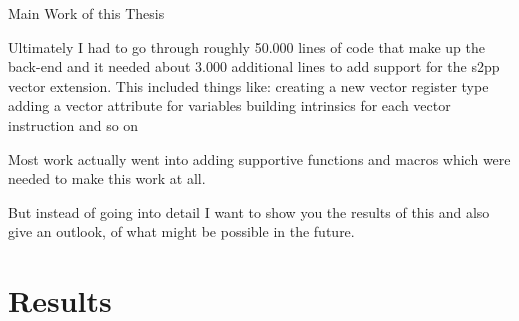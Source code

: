 \documentclass[10pt,aspectratio=169]{beamer}
\begin{document}
\begin{frame}[fragile]{Main Work of this Thesis}
{		Ultimately I had to go through roughly 50.000 lines of code that make up the back-end and it needed about 3.000 additional lines to add support for the s2pp vector extension.
		This included things like:
			creating a new vector register type
			adding a vector attribute for variables
			building intrinsics for each vector instruction
			and so on
		
		Most work actually went into adding supportive functions and macros which were needed to make this work at all.

		But instead of going into detail I want to show you the results of this and also give an outlook, of what might be possible in the future.
}
\end{frame}

\section{Results}
\end{document}

